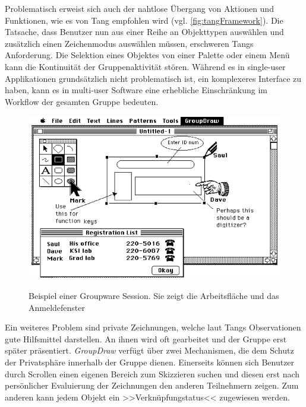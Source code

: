 \medskip Problematisch erweist sich auch der nahtlose Übergang von Aktionen und Funktionen, wie es von Tang \citep{TangJC:1989} empfohlen wird (vgl. \autoref{fig:tangFramework}). Die Tatsache, dass Benutzer nun aus einer Reihe an Objekttypen auswählen und zusätzlich einen Zeichenmodus auswählen müssen, erschweren Tangs Anforderung. Die Selektion eines Objektes von einer Palette oder einem Menü kann die Kontinuität der Gruppenaktivität stören. Während es in single-user Applikationen grundsätzlich nicht problematisch ist, ein komplexeres Interface zu haben, kann es in multi-user Software eine erhebliche Einschränkung im Workflow der gesamten Gruppe bedeuten. 

\begin{figure}
        {\includegraphics[width=1\linewidth]{gfx/greenbergGroupDraw}}
		\caption[GroupDraw \newline \citep{Greenberg:1992p83}]{Beispiel einer Groupware Session. Sie zeigt die Arbeitsfläche und das Anmeldefenster}\label{fig:greenbergGroupDraw}
\end{figure}

\medskip Ein weiteres Problem sind private Zeichnungen, welche laut Tangs Observationen gute Hilfsmittel darstellen. An ihnen wird oft gearbeitet und der Gruppe erst später präsentiert. \emph{GroupDraw} verfügt über zwei Mechanismen, die dem Schutz der Privatsphäre innerhalb der Gruppe dienen. Einerseits können sich Benutzer durch Scrollen einen eigenen Bereich zum Skizzieren suchen und diesen erst nach persönlicher Evaluierung der Zeichnungen den anderen Teilnehmern zeigen. Zum anderen kann jedem Objekt ein >>Verknüpfungstatus<< zugewiesen werden. \citep{Dewan:1991:FUI:108844.108851} 

